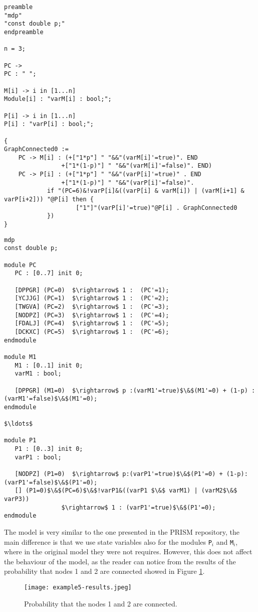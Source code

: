 \begin{lstlisting}[style=chor-color,caption={Choreographic language for the Random Graphs
	Protocol.},captionpos=b,label={ex4-code}]
	preamble
"mdp"
"const double p;"
endpreamble

n = 3;

PC -> 
PC : " ";

M[i] -> i in [1...n]
Module[i] : "varM[i] : bool;";

P[i] -> i in [1...n]
P[i] : "varP[i] : bool;";

{
GraphConnected0 := 
	PC -> M[i] : (+["1*p"] " "&&"(varM[i]'=true)". END
		        +["1*(1-p)"] " "&&"(varM[i]'=false)". END)
	PC -> P[i] : (+["1*p"] " "&&"(varP[i]'=true)" . END
		        +["1*(1-p)"] " "&&"(varP[i]'=false)".
			if "(PC=6)&!varP[i]&((varP[i] & varM[i]) | (varM[i+1] & varP[i+2])) "@P[i] then {
					["1"]"(varP[i]'=true)"@P[i] . GraphConnected0
			}) 								  
}
\end{lstlisting}
\begin{lstlisting}[style=prism-color,caption={Generated PRISM program for the Random Graphs
	Protocol.},captionpos=b,label={ex4-gen}]
mdp
const double p;
	
module PC
   PC : [0..7] init 0;
	
   [DPPGR] (PC=0)  $\rightarrow$ 1 :  (PC'=1); 
   [YCJJG] (PC=1)  $\rightarrow$ 1 :  (PC'=2); 
   [TWGVA] (PC=2)  $\rightarrow$ 1 :  (PC'=3); 
   [NODPZ] (PC=3)  $\rightarrow$ 1 :  (PC'=4); 
   [FDALJ] (PC=4)  $\rightarrow$ 1 :  (PC'=5); 
   [DCKXC] (PC=5)  $\rightarrow$ 1 :  (PC'=6); 
endmodule

module M1
   M1 : [0..1] init 0;
   varM1 : bool; 

   [DPPGR] (M1=0)  $\rightarrow$ p :(varM1'=true)$\&$(M1'=0) + (1-p) :(varM1'=false)$\&$(M1'=0); 
endmodule	

$\ldots$

module P1
   P1 : [0..3] init 0;
   varP1 : bool; 

   [NODPZ] (P1=0)  $\rightarrow$ p:(varP1'=true)$\&$(P1'=0) + (1-p):(varP1'=false)$\&$(P1'=0); 
   [] (P1=0)$\&$(PC=6)$\&$!varP1&((varP1 $\&$ varM1) | (varM2$\&$ varP3))  
   				$\rightarrow$ 1 : (varP1'=true)$\&$(P1'=0); 
endmodule
\end{lstlisting}

The model is very similar to the one presented in the PRISM repository, the main difference is that we use state variables also for the modules \texttt{P$_i$} and \texttt{M$_i$}, 
where in the original model they were not requires.
However, this does not affect the behaviour of the model, as the reader can notice from the results of the probability that nodes 1 and 2 are connected showed in Figure \ref{ex4-res}.
\begin{figure}[h]
\centering
\texttt{[image: example5-results.jpeg]}	
\caption{Probability that the nodes 1 and 2 are connected.}
\label{ex4-res}
\end{figure}
\newpage
